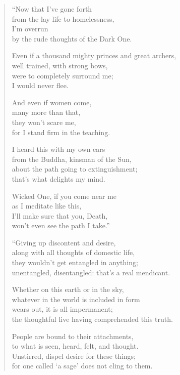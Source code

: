 \documentclass[12pt,openany]{book}%
\begin{document}
\begin{verse}%
“Now that I’ve gone forth \\
from the lay life to homelessness, \\
I’m overrun \\
by the rude thoughts of the Dark One. 

Even if a thousand mighty princes and great archers, \\
well trained, with strong bows, \\
were to completely surround me; \\
I would never flee. 

And even if women come, \\
many more than that, \\
they won’t scare me, \\
for I stand firm in the teaching. 

I heard this with my own ears \\
from the Buddha, kinsman of the Sun, \\
about the path going to extinguishment; \\
that’s what delights my mind. 

Wicked One, if you come near me \\
as I meditate like this, \\
I’ll make sure that you, Death, \\
won’t even see the path I take.” 

“Giving up discontent and desire, \\
along with all thoughts of domestic life, \\
they wouldn’t get entangled in anything; \\
unentangled, disentangled: that’s a real mendicant. 

Whether on this earth or in the sky, \\
whatever in the world is included in form \\
wears out, it is all impermanent; \\
the thoughtful live having comprehended this truth. 

People are bound to their attachments, \\
to what is seen, heard, felt, and thought. \\
Unstirred, dispel desire for these things; \\
for one called ‘a sage’ does not cling to them. 


\end{verse}
\end{document}
